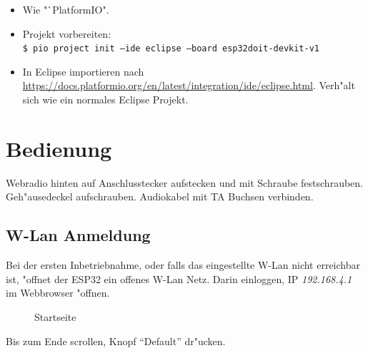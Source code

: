 \documentclass[ngerman,11pt,parskip=half] {scrartcl}
\begin{document}
\begin{itemize}
\item Wie "`PlatformIO".
\item Projekt vorbereiten:\\
		\texttt{\$ pio project init  --ide eclipse --board esp32doit-devkit-v1}
\item In Eclipse importieren nach \url{https://docs.platformio.org/en/latest/integration/ide/eclipse.html}. Verh"alt sich wie ein normales Eclipse Projekt.
\end{itemize}


\section{Bedienung} \label{sec:bedienung}

Webradio hinten auf Anschlusstecker aufstecken und mit Schraube festschrauben. Geh"ausedeckel aufschrauben. Audiokabel mit TA Buchsen verbinden.

\subsection{W-Lan Anmeldung} \label{sec:bedienung:wlan}

Bei der ersten Inbetriebnahme, oder falls das eingestellte W-Lan nicht erreichbar ist, "offnet der ESP32 ein offenes W-Lan Netz. Darin einloggen, IP \emph{192.168.4.1} im Webbrowser "offnen.

\begin{figure}[H]
\centering
{}
\caption{Startseite} \label{fig:1}
\end{figure}

Bis zum Ende scrollen, Knopf "`Default"' dr"ucken.
\end{document}
